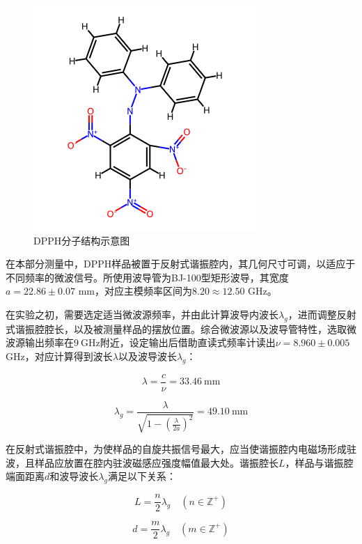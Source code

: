 \documentclass{thuemp}
\begin{document}
    \begin{figure}[H]
        \centering
        \includegraphics[width=0.5\linewidth]{./DPPH_molecule.png}
        \caption{DPPH分子结构示意图} \label{fig:DPPH}
    \end{figure}
    
    在本部分测量中，DPPH样品被置于反射式谐振腔内，其几何尺寸可调，以适应于不同频率的微波信号。所使用波导管为BJ-100型矩形波导，其宽度$a=22.86\pm0.07$ \si{\milli\meter}，对应主模频率区间为$8.20 \approx 12.50$ \si{\giga\hertz}。
    
    在实验之初，需要选定适当微波源频率，并由此计算波导内波长$\lambda_g$，进而调整反射式谐振腔腔长，以及被测量样品的摆放位置。综合微波源以及波导管特性，选取微波源输出频率在$9~\text{GHz}$附近，设定输出后借助直读式频率计读出$\nu  = 8.960 \pm 0.005$ \si{\giga\hertz}，对应计算得到波长$\lambda$以及波导波长$\lambda_g$：
    
    \begin{equation}
    \lambda = \frac{c}{\nu} = 33.46 ~\text{mm}
    \end{equation}
    
    \begin{equation}
    \lambda_g = \frac{\lambda}{\sqrt{1 - \left(\frac{\lambda}{2a}\right)^2}} = 49.10 ~\text{mm}
    \end{equation}
    
    在反射式谐振腔中，为使样品的自旋共振信号最大，应当使谐振腔内电磁场形成驻波，且样品应放置在腔内驻波磁感应强度幅值最大处。谐振腔长$L$，样品与谐振腔端面距离$d$和波导波长$\lambda_g$满足以下关系：
    
    \begin{equation}
    L = \frac{n}{2}\lambda_g \quad (n \in \mathbb{Z}^+)
    \end{equation}
    
    \begin{equation}
    d = \frac{m}{2}\lambda_g \quad (m \in \mathbb{Z}^+)
    \end{equation}
    
\end{document}
